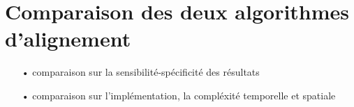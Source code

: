\section{Comparaison des deux algorithmes d'alignement}

	\begin{itemize}
		\item[•] comparaison sur la sensibilité-spécificité des résultats
		\item[•] comparaison sur l'implémentation, la compléxité temporelle et spatiale
	\end{itemize}